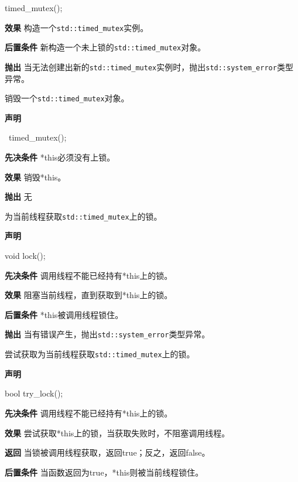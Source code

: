 \begin{cpp}
timed_mutex();
\end{cpp}

\textbf{效果}
构造一个\texttt{std::timed\_mutex}实例。

\textbf{后置条件}
新构造一个未上锁的\texttt{std::timed\_mutex}对象。

\textbf{抛出}
当无法创建出新的\texttt{std::timed\_mutex}实例时，抛出\texttt{std::system\_error}类型异常。


销毁一个\texttt{std::timed\_mutex}对象。

\textbf{声明}

\begin{cpp}
~timed_mutex();
\end{cpp}

\textbf{先决条件}
*this必须没有上锁。

\textbf{效果}
销毁*this。

\textbf{抛出}
无


为当前线程获取\texttt{std::timed\_mutex}上的锁。

\textbf{声明}

\begin{cpp}
void lock();
\end{cpp}

\textbf{先决条件}
调用线程不能已经持有*this上的锁。

\textbf{效果}
阻塞当前线程，直到获取到*this上的锁。

\textbf{后置条件}
*this被调用线程锁住。

\textbf{抛出}
当有错误产生，抛出\texttt{std::system\_error}类型异常。


尝试获取为当前线程获取\texttt{std::timed\_mutex}上的锁。

\textbf{声明}

\begin{cpp}
bool try_lock();
\end{cpp}

\textbf{先决条件}
调用线程不能已经持有*this上的锁。

\textbf{效果}
尝试获取*this上的锁，当获取失败时，不阻塞调用线程。

\textbf{返回}
当锁被调用线程获取，返回true；反之，返回false。

\textbf{后置条件}
当函数返回为true，*this则被当前线程锁住。


